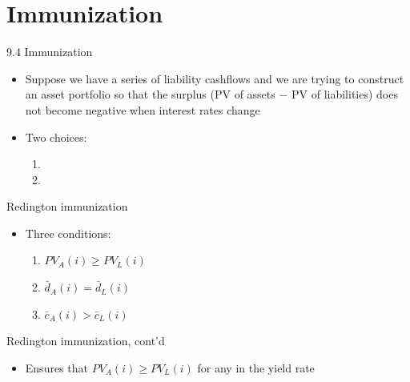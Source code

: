 \documentclass{beamer}
\begin{document}
\section{Immunization}

\begin{frame}{9.4 Immunization}

\begin{itemize}
\item Suppose we have a series of liability cashflows and we are trying to construct an asset portfolio so that the surplus (PV of assets $-$ PV of liabilities) does not become negative when interest rates change
\medskip
\item Two choices:
\begin{enumerate}
\item {}
\item {}
\end{enumerate}
\end{itemize}

\end{frame}

\begin{frame}{Redington immunization}

\begin{itemize}
\item Three conditions:
\begin{enumerate}
\item $PV_A(i) \ge PV_L(i)$
\item $\bar{d}_A(i) = \bar{d}_L(i)$
\item $\bar{c}_A(i) > \bar{c}_L(i)$
\end{enumerate}
\end{itemize}

\end{frame}

\begin{frame}{Redington immunization, cont'd}

\begin{itemize}
\item Ensures that $PV_A(i) \ge PV_L(i)$ for any  in the yield rate
\end{itemize}

\begin{center}
\end{center}

\end{frame}
\end{document}
